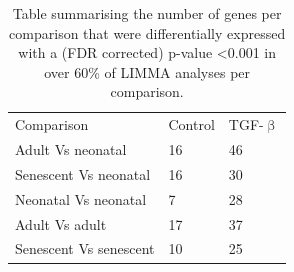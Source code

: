 \documentclass[alpha-refs]{wiley-article}
\newcommand{\tgf}{TGF-$\upbeta$}
\begin{document}
\begin{table}
	\centering
	\caption{Table summarising the number of genes per comparison that were differentially expressed with a (FDR corrected) p-value <0.001 in over 60\% of LIMMA analyses per comparison.}
	\begin{tabular}{lll}
		Comparison & Control & \tgf{} \\
		Adult Vs neonatal & 16 & 46 \\
		Senescent Vs neonatal & 16 & 30 \\
		Neonatal Vs neonatal & 7 & 28 \\
		Adult Vs adult & 17 & 37 \\
		Senescent Vs senescent & 10 & 25
	\end{tabular}
	\label{table:stats_summary}
\end{table}
\end{document}
